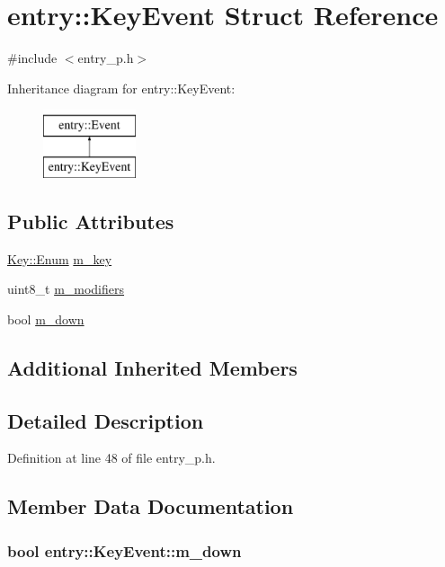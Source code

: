\hypertarget{structentry_1_1_key_event}{\section{entry\+:\+:Key\+Event Struct Reference}
\label{structentry_1_1_key_event}
}


{\ttfamily \#include $<$entry\+\_\+p.\+h$>$}

Inheritance diagram for entry\+:\+:Key\+Event\+:\begin{figure}[H]
\begin{center}
\leavevmode
\includegraphics[height=2.000000cm]{structentry_1_1_key_event}
\end{center}
\end{figure}
\subsection*{Public Attributes}
\begin{DoxyCompactItemize}
\item 
\hyperlink{structentry_1_1_key_a2c04c2d92f79b961243e4244603ca633}{Key\+::\+Enum} \hyperlink{structentry_1_1_key_event_a87db06183cecaa0b404c7214d8dc5352}{m\+\_\+key}
\item 
uint8\+\_\+t \hyperlink{structentry_1_1_key_event_a4e95b7d2d886451611a88c604bb69ff2}{m\+\_\+modifiers}
\item 
bool \hyperlink{structentry_1_1_key_event_a099699cb7d6c660e6d174cc69d8ef625}{m\+\_\+down}
\end{DoxyCompactItemize}
\subsection*{Additional Inherited Members}


\subsection{Detailed Description}


Definition at line 48 of file entry\+\_\+p.\+h.



\subsection{Member Data Documentation}
\hypertarget{structentry_1_1_key_event_a099699cb7d6c660e6d174cc69d8ef625}{
\subsubsection[{m\+\_\+down}]{\setlength{\rightskip}{0pt plus 5cm}bool entry\+::\+Key\+Event\+::m\+\_\+down}}\label{structentry_1_1_key_event_a099699cb7d6c660e6d174cc69d8ef625}


